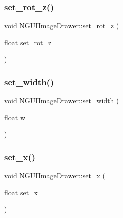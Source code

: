 \hypertarget{class_n_g_u_i_image_drawer_a326f52e5638fc637fb6f9542da143d50}{}\label{class_n_g_u_i_image_drawer_a326f52e5638fc637fb6f9542da143d50} 
\subsubsection{\texorpdfstring{set\+\_\+rot\+\_\+z()}{set\_rot\_z()}}
{\footnotesize\ttfamily void N\+G\+U\+I\+Image\+Drawer\+::set\+\_\+rot\+\_\+z (\begin{DoxyParamCaption}\item[{float}]{set\+\_\+rot\+\_\+z }\end{DoxyParamCaption})}

\hypertarget{class_n_g_u_i_image_drawer_a4df694401cbad44ac60ced5de8868ba9}{}\label{class_n_g_u_i_image_drawer_a4df694401cbad44ac60ced5de8868ba9} 
\subsubsection{\texorpdfstring{set\+\_\+width()}{set\_width()}}
{\footnotesize\ttfamily void N\+G\+U\+I\+Image\+Drawer\+::set\+\_\+width (\begin{DoxyParamCaption}\item[{float}]{w }\end{DoxyParamCaption})}

\hypertarget{class_n_g_u_i_image_drawer_a63e86bb786310290a39a9f44b026961c}{}\label{class_n_g_u_i_image_drawer_a63e86bb786310290a39a9f44b026961c} 
\subsubsection{\texorpdfstring{set\+\_\+x()}{set\_x()}}
{\footnotesize\ttfamily void N\+G\+U\+I\+Image\+Drawer\+::set\+\_\+x (\begin{DoxyParamCaption}\item[{float}]{set\+\_\+x }\end{DoxyParamCaption})}

